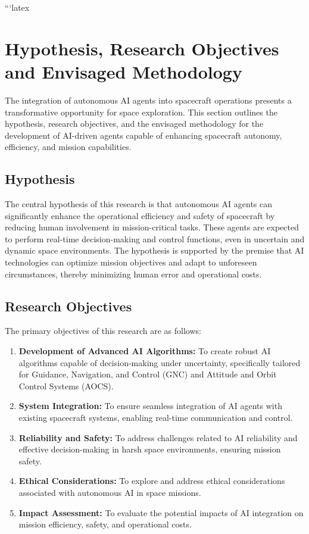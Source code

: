 \documentclass[a4paper, 11pt]{article}
\begin{document}
```latex
\section{Hypothesis, Research Objectives and Envisaged Methodology}

The integration of autonomous AI agents into spacecraft operations presents a transformative opportunity for space exploration. This section outlines the hypothesis, research objectives, and the envisaged methodology for the development of AI-driven agents capable of enhancing spacecraft autonomy, efficiency, and mission capabilities.

\subsection{Hypothesis}

The central hypothesis of this research is that autonomous AI agents can significantly enhance the operational efficiency and safety of spacecraft by reducing human involvement in mission-critical tasks. These agents are expected to perform real-time decision-making and control functions, even in uncertain and dynamic space environments. The hypothesis is supported by the premise that AI technologies can optimize mission objectives and adapt to unforeseen circumstances, thereby minimizing human error and operational costs.

\subsection{Research Objectives}

The primary objectives of this research are as follows:

\begin{enumerate}
    \item \textbf{Development of Advanced AI Algorithms:} To create robust AI algorithms capable of decision-making under uncertainty, specifically tailored for Guidance, Navigation, and Control (GNC) and Attitude and Orbit Control Systems (AOCS).
    \item \textbf{System Integration:} To ensure seamless integration of AI agents with existing spacecraft systems, enabling real-time communication and control.
    \item \textbf{Reliability and Safety:} To address challenges related to AI reliability and effective decision-making in harsh space environments, ensuring mission safety.
    \item \textbf{Ethical Considerations:} To explore and address ethical considerations associated with autonomous AI in space missions.
    \item \textbf{Impact Assessment:} To evaluate the potential impacts of AI integration on mission efficiency, safety, and operational costs.
\end{enumerate}
\end{document}
